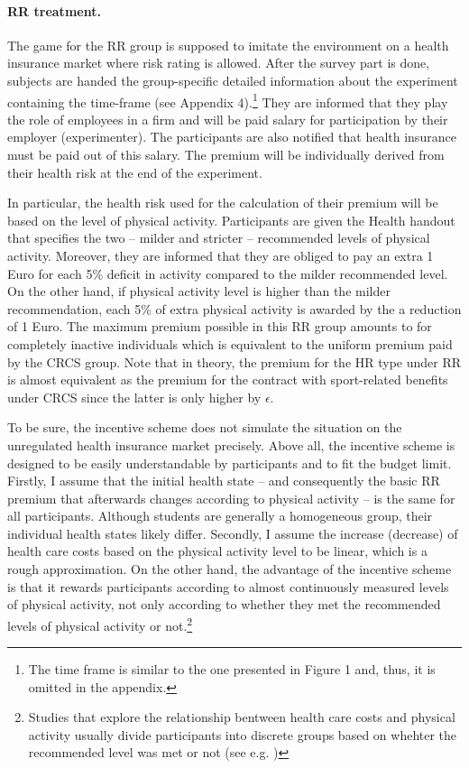 \documentclass[12pt,english]{article}%
\makeatletter
\renewcommand{\subsection}{\@startsection{subsection}{2}{0mm}{-0.1\baselineskip}{0.5\baselineskip}{\normalfont\bf\flushleft}}
\makeatother
\begin{document}
\subsection {Treatments}        

\paragraph{RR treatment.} The game for the RR group is supposed to imitate the environment on a health insurance market where risk rating is allowed.  After the survey part is done, subjects are handed the group-specific detailed information about the experiment containing the time-frame (see Appendix 4).\footnote{The time frame is similar to the one presented in Figure 1 and, thus, it is omitted in the appendix.} They are informed that they play the role of employees in a firm and will be paid salary  for participation by their employer (experimenter). The participants are also notified that health insurance must be paid out of this salary. The premium will be individually derived from their health risk at the end of the experiment. 

In particular, the health risk used for the calculation of their premium will be based on the level of physical activity. Participants are given the Health handout that specifies the two -- milder and stricter -- recommended levels of physical activity. Moreover, they are informed that they are obliged to pay an extra 1 Euro for each 5\% deficit in activity compared to the milder recommended level. On the other hand, if physical activity level is higher than the milder recommendation, each 5\% of extra physical activity is awarded by the a reduction of 1 Euro. The maximum premium possible in this RR group amounts to  for completely inactive individuals which is equivalent to the uniform premium paid by the CRCS group. Note that in theory, the premium for the HR type under RR is almost equivalent as the premium for the contract with sport-related benefits under CRCS since the latter is only higher by $\epsilon$.  

To be sure, the incentive scheme does not simulate the situation on the unregulated health insurance market precisely. Above all, the incentive scheme is designed to be easily understandable by participants and to fit the budget limit. Firstly, I assume that the initial health state -- and consequently the basic RR premium that afterwards changes according to physical activity -- is the same for all participants. Although students are generally a homogeneous group, their individual health states likely differ. Secondly, I assume the increase (decrease) of health care costs based on the physical activity level to be linear, which is a rough approximation. On the other hand, the advantage of the incentive scheme is that it rewards participants according to almost continuously measured levels of physical activity, not only according to whether they met the recommended levels of physical activity or not.\footnote{Studies that explore the relationship bentween health care costs and physical activity usually divide participants into discrete groups based on whehter the recommended level was met or not (see e.g. \cite{carlson2015})}   
      
\end{document}
